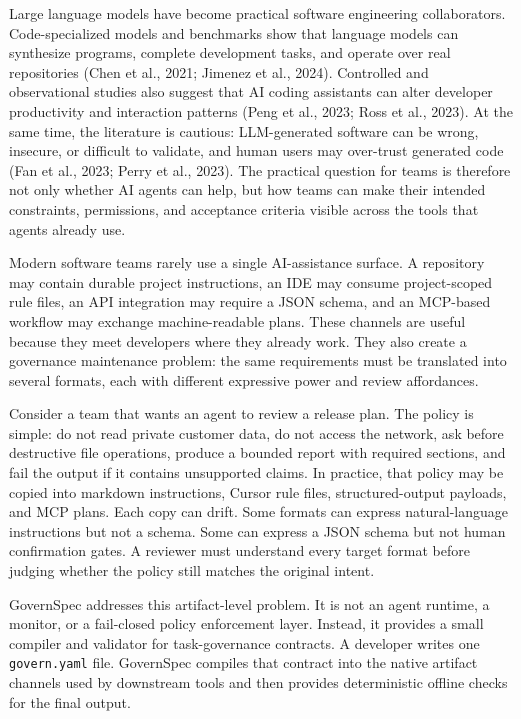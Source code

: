 \documentclass[11pt]{article}
\begin{document}
Large language models have become practical software engineering collaborators.
Code-specialized models and benchmarks show that language models can synthesize
programs, complete development tasks, and operate over real repositories (Chen et
al., 2021; Jimenez et al., 2024). Controlled and observational studies also suggest
that AI coding assistants can alter developer productivity and interaction patterns
(Peng et al., 2023; Ross et al., 2023). At the same time, the literature is cautious:
LLM-generated software can be wrong, insecure, or difficult to validate, and human
users may over-trust generated code (Fan et al., 2023; Perry et al., 2023). The
practical question for teams is therefore not only whether AI agents can help, but
how teams can make their intended constraints, permissions, and acceptance criteria
visible across the tools that agents already use.

Modern software teams rarely use a single AI-assistance surface. A repository may
contain durable project instructions, an IDE may consume project-scoped rule files,
an API integration may require a JSON schema, and an MCP-based workflow may exchange
machine-readable plans. These channels are useful because they meet developers where
they already work. They also create a governance maintenance problem: the same
requirements must be translated into several formats, each with different expressive
power and review affordances.

Consider a team that wants an agent to review a release plan. The policy is simple:
do not read private customer data, do not access the network, ask before destructive
file operations, produce a bounded report with required sections, and fail the
output if it contains unsupported claims. In practice, that policy may be copied
into markdown instructions, Cursor rule files, structured-output payloads, and MCP
plans. Each copy can drift. Some formats can express natural-language instructions
but not a schema. Some can express a JSON schema but not human confirmation gates. A
reviewer must understand every target format before judging whether the policy still
matches the original intent.

GovernSpec addresses this artifact-level problem. It is not an agent runtime, a
monitor, or a fail-closed policy enforcement layer. Instead, it provides a small
compiler and validator for task-governance contracts. A developer writes one
\texttt{govern.yaml} file. GovernSpec compiles that contract into the native
artifact channels used by downstream tools and then provides deterministic offline
checks for the final output.
\end{document}
